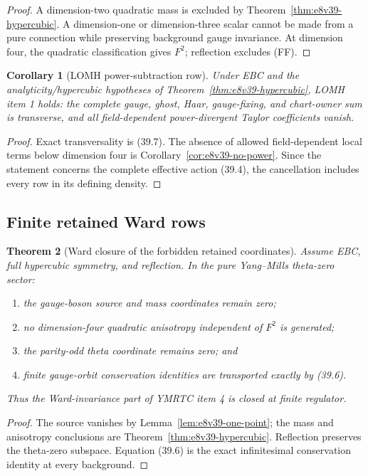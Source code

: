 \documentclass[11pt,oneside]{book}
\newtheorem{theorem}{Theorem}[chapter]
\newtheorem{corollary}[theorem]{Corollary}
\theoremstyle{definition}
\theoremstyle{remark}
\begin{document}
\begin{proof}
A dimension-two quadratic mass is excluded by
Theorem~\ref{thm:e8v39-hypercubic}.  A dimension-one or
dimension-three scalar cannot be made from a pure connection while
preserving background gauge invariance.  At dimension four,
the quadratic classification gives \(F^2\); reflection excludes
(F\wedge F)\).
\end{proof}

\begin{corollary}[LOMH power-subtraction row]
\label{cor:e8v39-LOMH1}
Under EBC and the analyticity/hypercubic hypotheses of
Theorem~\ref{thm:e8v39-hypercubic}, LOMH item 1 holds: the complete
gauge, ghost, Haar, gauge-fixing, and chart-owner sum is transverse,
and all field-dependent power-divergent Taylor coefficients vanish.
\end{corollary}

\begin{proof}
Exact transversality is (39.7).  The absence of allowed
field-dependent local terms below dimension four is
Corollary~\ref{cor:e8v39-no-power}.  Since the statement concerns the
complete effective action (39.4), the cancellation includes every
row in its defining density.
\end{proof}

\subsection{Finite retained Ward rows}

\begin{theorem}[Ward closure of the forbidden retained coordinates]
\label{thm:e8v39-retained-Ward}
Assume EBC, full hypercubic symmetry, and reflection.  In the pure
Yang--Mills theta-zero sector:
\begin{enumerate}
\item the gauge-boson source and mass coordinates remain zero;
\item no dimension-four quadratic anisotropy independent of \(F^2\)
      is generated;
\item the parity-odd theta coordinate remains zero; and
\item finite gauge-orbit conservation identities are transported
      exactly by (39.6).
\end{enumerate}
Thus the Ward-invariance part of YMRTC item 4 is closed at finite
regulator.
\end{theorem}

\begin{proof}
The source vanishes by Lemma~\ref{lem:e8v39-one-point}; the mass and
anisotropy conclusions are
Theorem~\ref{thm:e8v39-hypercubic}.  Reflection preserves the
theta-zero subspace.  Equation (39.6) is the exact infinitesimal
conservation identity at every background.
\end{proof}
\end{document}
